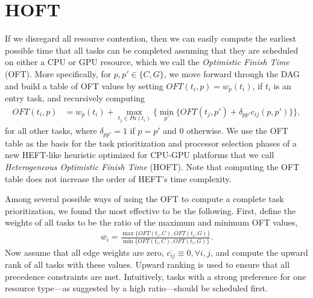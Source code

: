\documentclass[runningheads]{llncs}
\begin{document}
\section{HOFT}
\label{sect.hoft}

If we disregard all resource contention, then we can easily compute the earliest possible time that all tasks can be completed assuming that they are scheduled on either a CPU or GPU resource, which we call the {\em Optimistic Finish Time} (OFT). More specifically, for $p, p' \in \{C, G\}$, we move forward through the DAG and build a table of OFT values by setting $OFT(t_i, p) = w_p(t_i)$, if $t_i$ is an entry task, and recursively computing     
\begin{align}
\label{eq.oft_table}
OFT(t_i, p) &= w_p(t_i) + \max_{t_j \in Pa(t_i)} \bigg \{ \min_{p'} \{ OFT(t_j, p') + \delta_{pp'} c_{ij} (p, p') \}  \bigg \}, 
\end{align}
for all other tasks, where $\delta_{pp'} = 1$ if $p = p'$ and $0$ otherwise. We use the OFT table as the basis for the task prioritization and processor selection phases of a new HEFT-like heuristic optimized for CPU-GPU platforms that we call {\em Heterogeneous Optimistic Finish Time} (HOFT). Note that computing the OFT table does not increase the order of HEFT's time complexity.  

Among several possible ways of using the OFT to compute a complete task prioritization, we found the most effective to be the following. First, define the weights of all tasks to be the ratio of the maximum and minimum OFT values,
\begin{align}
\label{eq.hoft_weights}
\overline{w_i} = \frac{\max\{ OFT(t_i, C), OFT(t_i, G) \}}{\min\{ OFT(t_i, C), OFT(t_i, G) \}}.
\end{align} 
Now assume that all edge weights are zero, $\overline{c_{ij}} \equiv 0, \forall i, j$, and compute the upward rank of all tasks with these values. Upward ranking is used to ensure that all precedence constraints are met. Intuitively, tasks with a strong preference for one resource type---as suggested by a high ratio---should be scheduled first. 
\end{document}
